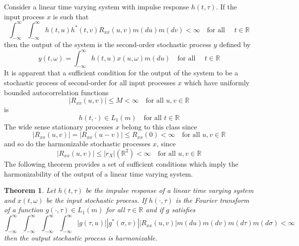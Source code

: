 \documentclass{article}
\newcommand{\cdummy}{\cdot}
\newtheorem{theorem}{Theorem}
\begin{document}
Consider a linear time varying system with impulse response $h (t, \tau)$. If
the input process $x$ is such that
\begin{equation}
  \int_{- \infty}^{\infty} \int_{- \infty}^{\infty} h (t, u) h^{\ast}  (t, v)
  R_{xx} (u, v) m (du) m (dv) < \infty \quad \text{for all } \quad t \in
  \mathbb{R} \label{eq:impulse-finite}
\end{equation}
then the output of the system is the second-order stochastic process $y$
defined by
\begin{equation}
  y (t, \omega) = \int_{- \infty}^{\infty} h (t, u) x (u, \omega) m (du) 
  \quad \text{for all } \quad t \in \mathbb{R} \label{eq:y-output}
\end{equation}
It is apparent that a sufficient condition for the output of the system to be
a stochastic process of second-order for all input processes $x$ which have
uniformly bounded autocorrelation functions
\begin{equation}
  |R_{xx} (u, v) | \leqslant M < \infty \quad \text{for all } u, v \in
  \mathbb{R} \label{eq:Rxx-bounded}
\end{equation}
is
\begin{equation}
  h (t, \cdot) \in L_1 (m)  \quad \text{for all } t \in \mathbb{R}
  \label{eq:h-L1}
\end{equation}
The wide sense stationary processes $x$ belong to this class since
\begin{equation}
  |R_{xx} (u, v) | = |R_{xx} (u - v) | \leqslant R_{xx} (0) < \infty \quad
  \text{for all } u, v \in \mathbb{R} \label{eq:Rxx-stationary}
\end{equation}
and so do the harmonizable stochastic processes $x$, since
\begin{equation}
  |R_{xx} (u, v) | \leqslant |r_X | (\mathbb{R}^2) < \infty \quad \text{for
  all } u, v \in \mathbb{R} \label{eq:Rxx-harmonizable}
\end{equation}
The following theorem provides a set of sufficient conditions which imply the
harmonizability of the output of a linear time varying system.

\begin{theorem}
  \label{thm:linear-system-harmonizable}Let $h (t, \tau)$ be the impulse
  response of a linear time varying system and $x (t, \omega)$ be the input
  stochastic process. If $h (\cdummy, \tau)$ is the Fourier transform of a
  function $g (\cdummy, \tau) \in L_1 (m)$ for all $\tau \in \mathbb{R}$ and
  if $g$ satisfies
  \begin{equation}
    \int_{- \infty}^{\infty} \int_{- \infty}^{\infty} \int_{- \infty}^{\infty}
    \int_{- \infty}^{\infty} |g (\tau, u) | |g^{\ast} (\sigma, v) | |R_{xx}
    (u, v) | m (du) m (dv) m (d \tau) m (d \sigma) < \infty
    \label{eq:g-condition}
  \end{equation}
  then the output stochastic process is harmonizable.
\end{theorem}
\end{document}
